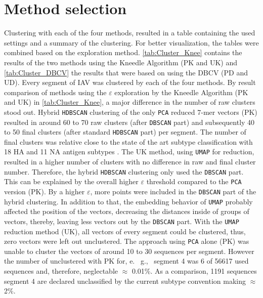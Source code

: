 \section{Method selection} \label{sec:Clustering}

Clustering with each of the four methods, resulted in a table containing the used settings and a summary of the clustering. For better visualization, the tables were combined based on the exploration method. \autoref{tab:Cluster_Knee} contains the results of the two methods using the Kneedle Algorithm (PK and UK) and \autoref{tab:Cluster_DBCV} the results that were based on using the \gls{DBCV} (PD and UD). Every segment of \gls{IAV} was clustered by each of the four methods. By result comparison of methods using the $\varepsilon$ exploration by the Kneedle Algorithm (PK and UK) in \autoref{tab:Cluster_Knee}, a major difference in the number of raw clusters stood out. Hybrid \texttt{HDBSCAN} clustering of the only \texttt{PCA} reduced 7-mer vectors (PK) resulted in around 60 to 70 raw clusters (after \texttt{DBSCAN} part) and subsequently 40 to 50 final clusters (after standard \texttt{HDBSCAN} part) per segment. The number of final clusters was relative close to the state of the art subtype classification with 18 \gls{HA} and 11 \gls{NA} antigen subtypes \autocite{noauthor_revision_1980}. The UK method, using \texttt{UMAP} for reduction, resulted in a higher number of clusters with no difference in raw and final cluster number. Therefore, the hybrid \texttt{HDBSCAN} clustering only used the \texttt{DBSCAN} part. This can be explained by the overall higher $\varepsilon$ threshold compared to the \texttt{PCA} version (PK). By a higher $\varepsilon$, more points were included in the \texttt{DBSCAN} part of the hybrid clustering. In addition to that, the embedding behavior of \texttt{UMAP} probably affected the position of the vectors, decreasing the distances inside of groups of vectors, thereby, leaving less vectors out by the \texttt{DBSCAN} part. With the \texttt{UMAP} reduction method (UK), all vectors of every segment could be clustered, thus, zero vectors were left out unclustered. The approach using \texttt{PCA} alone (PK) was unable to cluster the vectors of around 10 to 30 sequences per segment. However the number of unclustered with PK for, e.~ g.,~ segment 4 was 6 of 56617 used sequences and, therefore, neglectable $\approx$ 0.01\%. As a comparison, 1191 sequences segment 4 are declared unclassified by the current subtype convention making $\approx$ 2\%. 

